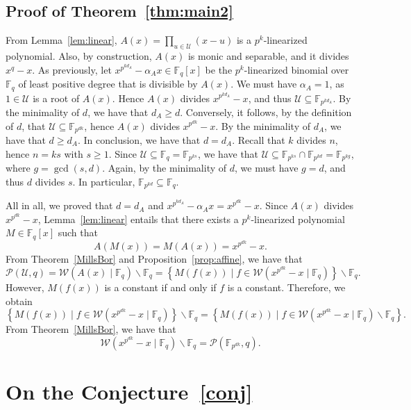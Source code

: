 \documentclass[11pt]{amsart}
\theoremstyle{definition}
\theoremstyle{remark}
\begin{document}
\subsection{ Proof of Theorem~\ref{thm:main2}}
From Lemma~\ref{lem:linear}, $A(x)=\prod_{u \in \mathcal{U}}(x-u)$ is a $p^k$-linearized polynomial. Also, by construction, $A(x)$ is monic and separable, and it divides $x^q-x$. As previously, let $x^{p^{k d_A}}-\alpha_A x \in \mathbb{F}_q[x]$ be the $p^k$-linearized binomial over $\mathbb{F}_q$ of least positive degree that is divisible by $A(x)$. We must have $\alpha_A=1$, as $1 \in \mathcal{U}$ is a root of $A(x)$. Hence $A(x)$ divides $x^{p^{k d_A}}-x$, and thus  $\mathcal{U} \subseteq \mathbb{F}_{p^{kd_A}}$. By the minimality of $d$, we have that $d_A \geq d$. Conversely, it follows, by the definition of $d$, that $\mathcal{U} \subseteq \mathbb{F}_{p^{d k}}$, hence $A(x)$ divides $x^{p^{d k}}-x$. By the minimality of $d_A$, we have that $d \geq d_A$. In conclusion, we have that $d=d_A$. Recall that $k$ divides $n$, hence $n=k s$ with $s \geq 1$. Since $\mathcal{U} \subseteq \mathbb{F}_q=\mathbb{F}_{p^{k s}}$, we have that $\mathcal{U} \subseteq \mathbb{F}_{p^{k s}} \cap \mathbb{F}_{p^{k d}}=\mathbb{F}_{p^{k g}}$, where $g=\operatorname{gcd}(s, d)$. Again, by the minimality of $d$, we must have $g=d$,  and thus $d$ divides $s$. In particular,  $\mathbb{F}_{p^{k d}} \subseteq \mathbb{F}_q$.

All in all, we proved that $d=d_A$ and $x^{p^{k d_A}}-\alpha_A x=x^{p^{d k}}-x$. Since $A(x)$ divides $x^{p^{dk}}-x$, Lemma~\ref{lem:linear} entails that there exists a $p^k$-linearized polynomial $M \in \mathbb{F}_q[x]$ such that
$$
A(M(x))=M(A(x))=x^{p^{d k}}-x .
$$
From Theorem~\ref{MillsBor} and Proposition~\ref{prop:affine}, we have that
$$
\mathcal{P}(\mathcal{U}, q)=\mathcal{W}\left(A(x) \mid \mathbb{F}_q\right) \backslash \mathbb{F}_q=\left\{M(f(x)) \mid f \in \mathcal{W}\left(x^{p^{d k}}-x \mid \mathbb{F}_q\right)\right\} \backslash \mathbb{F}_q .
$$
However, $M(f(x))$ is a constant if and only if $f$ is a constant. Therefore, we obtain
\small
$$
\left\{M(f(x)) \mid f \in \mathcal{W}\left(x^{p^{d k}}-x \mid \mathbb{F}_q\right)\right\} \backslash \mathbb{F}_q=\left\{M(f(x)) \mid f \in \mathcal{W}\left(x^{p^{d k}}-x \mid \mathbb{F}_q\right) \backslash \mathbb{F}_q\right\}.
$$
From Theorem~\ref{MillsBor}, we have that
$$
\mathcal{W}\left(x^{p^{d k}}-x \mid \mathbb{F}_q\right) \backslash \mathbb{F}_q=\mathcal{P}\left(\mathbb{F}_{p^{d k}}, q\right) .
$$


\section{On the Conjecture~\ref{conj}}
\end{document}
